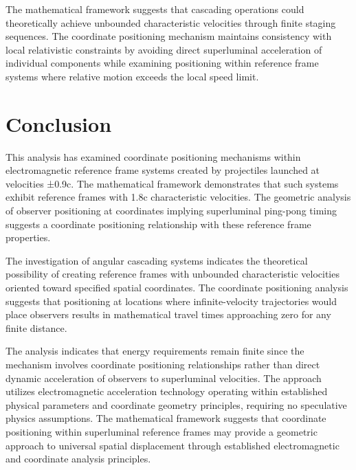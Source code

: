 \documentclass[12pt,a4paper]{article}
\begin{document}
The mathematical framework suggests that cascading operations could theoretically achieve unbounded characteristic velocities through finite staging sequences. The coordinate positioning mechanism maintains consistency with local relativistic constraints by avoiding direct superluminal acceleration of individual components while examining positioning within reference frame systems where relative motion exceeds the local speed limit.

\section{Conclusion}

This analysis has examined coordinate positioning mechanisms within electromagnetic reference frame systems created by projectiles launched at velocities ±0.9c. The mathematical framework demonstrates that such systems exhibit reference frames with 1.8c characteristic velocities. The geometric analysis of observer positioning at coordinates implying superluminal ping-pong timing suggests a coordinate positioning relationship with these reference frame properties.

The investigation of angular cascading systems indicates the theoretical possibility of creating reference frames with unbounded characteristic velocities oriented toward specified spatial coordinates. The coordinate positioning analysis suggests that positioning at locations where infinite-velocity trajectories would place observers results in mathematical travel times approaching zero for any finite distance.

The analysis indicates that energy requirements remain finite since the mechanism involves coordinate positioning relationships rather than direct dynamic acceleration of observers to superluminal velocities. The approach utilizes electromagnetic acceleration technology operating within established physical parameters and coordinate geometry principles, requiring no speculative physics assumptions. The mathematical framework suggests that coordinate positioning within superluminal reference frames may provide a geometric approach to universal spatial displacement through established electromagnetic and coordinate analysis principles.
\end{document}
